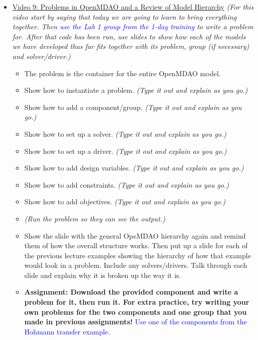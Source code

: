 \documentclass[12pt, letterpaper]{article}
\begin{document}
\begin{itemize}
	\item \underline{Video 9: Problems in OpenMDAO and a Review of Model Hierarchy} \textit{(For this video start by saying that today we are going to learn to bring everything together. Then \textcolor{blue}{use the Lab 1 group from the 1-day training} to write a problem for. After that code has been run, use slides to show how each of the models we have developed thus far fits together with its problem, group (if necessary) and solver/driver.)}
		\begin{itemize}
			\item The problem is the container for the entire OpenMDAO model.
			\item Show how to instantiate a problem. \textit{(Type it out and explain as you go.)}
			\item Show how to add a component/group. \textit{(Type it out and explain as you go.)}
			\item Show how to set up a solver. \textit{(Type it out and explain as you go.)}
			\item Show how to set up a driver. \textit{(Type it out and explain as you go.)}
			\item Show how to add design variables. \textit{(Type it out and explain as you go.)}
			\item Show how to add constraints. \textit{(Type it out and explain as you go.)}
			\item Show how to add objectives. \textit{(Type it out and explain as you go.)}
			\item \textit{(Run the problem so they can see the output.)}
			\item Show the slide with the general OpeMDAO hierarchy again and remind them of how the overall structure works. Then put up a slide for each of the previous lecture examples showing the hierarchy of how that example would look in a problem. Include any solvers/drivers. Talk through each slide and explain why it is broken up the way it is.
			\item \textbf{Assignment: Download the provided component and write a problem for it, then run it. For extra practice, try writing your own problems for the two components and one group that you made in previous assignments!} \textcolor{blue}{Use one of the components from the Hohmann transfer example.}
		\end{itemize}


\end{itemize}
\end{document}
